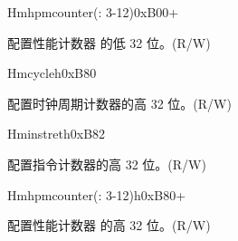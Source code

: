 \begin{register}{H}{mhpmcounter(: 3-12)}{0xB00+}\label{regdesc:LPMHPMCOUNTER}
%
\regnewline%
\begin{regdesc}\begin{reglist}
\label{fielddesc:LPMHMPCOUNTER}\item [MHPMCOUNTER\regindex{n}] 配置性能计数器  的低 32 位。(R/W)
\end{reglist}\end{regdesc}
\end{register}


\begin{register}{H}{mcycleh}{0xB80}\label{regdesc:LPMCYCLEH}
%
\regnewline%
\begin{regdesc}\begin{reglist}
\label{fielddesc:LPMCYCLEH}\item [MCYCLEH] 配置时钟周期计数器的高 32 位。(R/W)
\end{reglist}\end{regdesc}
\end{register}

\begin{register}{H}{minstreth}{0xB82}\label{regdesc:LPMINSTRETH}
%
\regnewline%
\begin{regdesc}\begin{reglist}
\label{fielddesc:LPMINSTRETH}\item [MINSTRETH] 配置指令计数器的高 32 位。(R/W)
\end{reglist}\end{regdesc}
\end{register}


\begin{register}{H}{mhpmcounter(: 3-12)h}{0xB80+}\label{regdesc:LPMHPMCOUNTERH}
%
\regnewline%
\begin{regdesc}\begin{reglist}
\label{fielddesc:LPMHMPCOUNTERH}\item [MHPMCOUNTER\regindex{n}h] 配置性能计数器  的高 32 位。(R/W)
\end{reglist}\end{regdesc}
\end{register}


